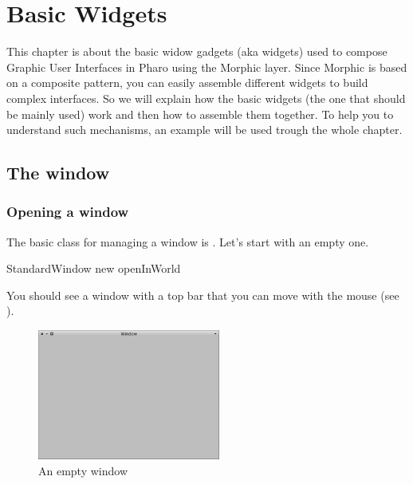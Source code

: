 \documentclass[a4paper,10pt,twoside]{book}
\begin{document}
\fi
\sloppy

\chapter{Basic Widgets}

This chapter is about the basic widow gadgets (aka widgets) used to compose Graphic User Interfaces in Pharo using the Morphic layer. Since Morphic is based on a composite pattern,  you can easily assemble different widgets to build complex interfaces. So we will explain how the basic widgets (the one that should be mainly used) work and then how to assemble them together. To help you to understand such mechanisms, an example will be used trough the whole chapter.

\section{The window}


\subsection{Opening a window}
The basic class for managing a window is . Let's start with an empty one.


\begin{code}{}
StandardWindow new openInWorld
\end{code}
You should see a window with a top bar  that you can move with the mouse (see ). 

\begin{figure}[ht]
\begin{center}
	\includegraphics[width=6cm]{EmptyWindow}
	\caption{An empty window}
\end{center}
\end{figure} 
\end{document}

